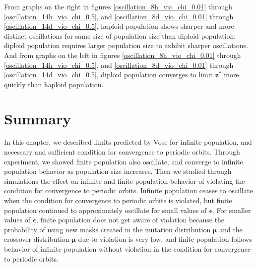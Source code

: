 From graphs on the right in 
figures \ref{oscillation_8h_vio_chi_0.01} through \ref{oscillation_14h_vio_chi_0.5}, 
and \ref{oscillation_8d_vio_chi_0.01} through \ref{oscillation_14d_vio_chi_0.5}, haploid population shows sharper and 
more distinct oscillations for same size of population size than diploid population; diploid population 
requires larger population size to exhibit sharper oscillations. 
And from graphs on the left in figures \ref{oscillation_8h_vio_chi_0.01} through \ref{oscillation_14h_vio_chi_0.5}, and \ref{oscillation_8d_vio_chi_0.01} through \ref{oscillation_14d_vio_chi_0.5}, diploid population converges to limit $\bm{z}^\ast$ more quickly than haploid population. 

\section{Summary}
In this chapter, we described limits predicted by Vose for infinite population, and necessary and sufficient condition 
for convergence to periodic orbits. Through experiment, we showed finite population also oscillate, 
and converge to infinite population behavior as population size increases. 
Then we studied through simulations the effect on infinite and finite population behavior of violating the condition 
for convergence to periodic orbits. Infinite population ceases to oscillate when the condition for convergence to 
periodic orbits is violated, but finite population continued to approximately oscillate for small values of $\bm{\epsilon}$. 
For smaller values of $\bm{\epsilon}$, finite population does not get aware of violation because the probability of using 
new masks created in the mutation distribution $\bm{\mu}$ and the crossover distribution $\bm{\mu}$ due to violation is very low, and 
finite population follows behavior of infinite population without violation in the condition for convergence to 
periodic orbits.





 
